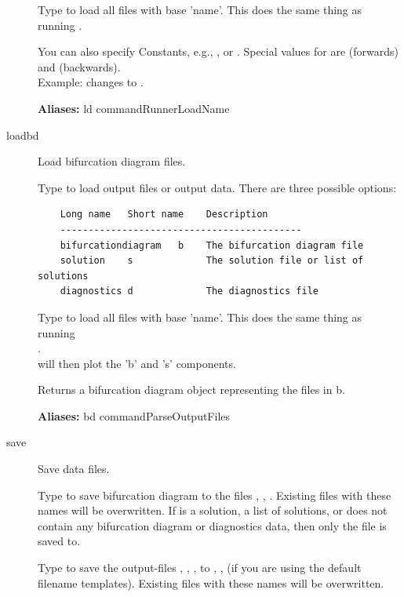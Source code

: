 \documentclass[12pt]{report}
\begin{document}
\begin{description}
    Type  to load all files with base 'name'.
    This does the same thing as running
    .
 
    You can also specify \AUTO Constants, e.g., , or .
    Special values for  are  (forwards) and  (backwards).\\
    Example:  changes  to .

    \textbf{Aliases:} ld commandRunnerLoadName

\item[loadbd]
    Load bifurcation diagram files.

    Type  to load output files or output data.
    There are three possible options:
    \begin{verbatim}
    Long name   Short name    Description
    -------------------------------------------
    bifurcationdiagram   b    The bifurcation diagram file
    solution    s             The solution file or list of solutions
    diagnostics d             The diagnostics file
    \end{verbatim}

    Type  to load all files with base 'name'.
    This does the same thing as running\\
    .\\
     will then plot the 'b' and 's' components.

    Returns a bifurcation diagram object representing the files in b.

    \textbf{Aliases:} bd commandParseOutputFiles

\item[save]
Save data files.

    Type  to save bifurcation diagram 
    to the files , , . 
    Existing files with these names will be overwritten.
    If  is a solution, a list of solutions, or does not contain any
    bifurcation diagram or diagnostics data, then only the file 
    is saved to.

    Type  to save the output-files ,
    , , to , ,
     (if you are using the default filename
    templates).  Existing files with these names will be overwritten.


\end{description}
\end{document}
